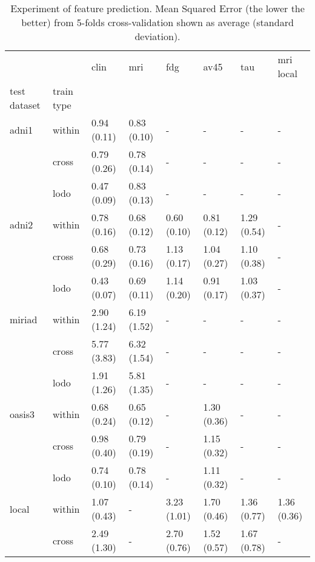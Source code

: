 \begin{table*}
\centering
\caption{
Experiment of feature prediction.
Mean Squared Error (the lower the better) from 5-folds cross-validation shown as average (standard deviation).
}
\begin{tabular}{llllllll}
\toprule
       &      &         clin &           mri &          fdg &         av45 &          tau &   mri local \\
test dataset & train type &              &               &              &              &              &              \\
\midrule
adni1 & within &  0.94 (0.11) &  0.83 (0.10) &            - &            - &            - &            - \\
       & cross &  0.79 (0.26) &  0.78 (0.14) &            - &            - &            - &            - \\
       & lodo &  0.47 (0.09) &  0.83 (0.13) &            - &            - &            - &            - \\
\midrule
adni2 & within &  0.78 (0.16) &  0.68 (0.12) &  0.60 (0.10) &  0.81 (0.12) &  1.29 (0.54) &            - \\
       & cross &  0.68 (0.29) &  0.73 (0.16) &  1.13 (0.17) &  1.04 (0.27) &  1.10 (0.38) &            - \\
       & lodo &  0.43 (0.07) &  0.69 (0.11) &  1.14 (0.20) &  0.91 (0.17) &  1.03 (0.37) &            - \\
\midrule
miriad & within &  2.90 (1.24) &  6.19 (1.52) &            - &            - &            - &            - \\
       & cross &  5.77 (3.83) &  6.32 (1.54) &            - &            - &            - &            - \\
       & lodo &  1.91 (1.26) &  5.81 (1.35) &            - &            - &            - &            - \\
\midrule
oasis3 & within &  0.68 (0.24) &  0.65 (0.12) &            - &  1.30 (0.36) &            - &            - \\
       & cross &  0.98 (0.40) &  0.79 (0.19) &            - &  1.15 (0.32) &            - &            - \\
       & lodo &  0.74 (0.10) &  0.78 (0.14) &            - &  1.11 (0.32) &            - &            - \\
\midrule
local  & within &  1.07 (0.43) &            - &  3.23 (1.01) &  1.70 (0.46) &  1.36 (0.77) &  1.36 (0.36) \\
       & cross &  2.49 (1.30) &            - &  2.70 (0.76) &  1.52 (0.57) &  1.67 (0.78) &            - \\

\end{tabular}
\end{table*}
